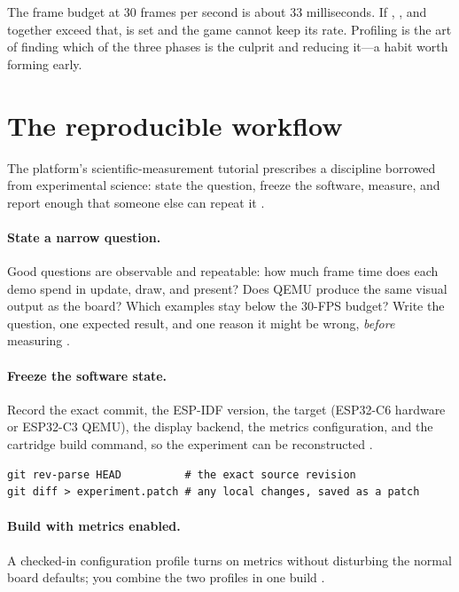 \begin{prgconcept}
The frame budget at 30 frames per second is about 33 milliseconds. If
, , and  together exceed that,
 is set and the game cannot keep its rate. Profiling is the
art of finding which of the three phases is the culprit and reducing it---a habit
worth forming early.
\end{prgconcept}

\section{The reproducible workflow}

The platform's scientific-measurement tutorial prescribes a discipline borrowed
from experimental science: state the question, freeze the software, measure, and
report enough that someone else can repeat it \citep{prg32scimeasure}.

\paragraph{State a narrow question.} Good questions are observable and repeatable:
how much frame time does each demo spend in update, draw, and present? Does QEMU
produce the same visual output as the board? Which examples stay below the 30-FPS
budget? Write the question, one expected result, and one reason it might be wrong,
\emph{before} measuring \citep{prg32scimeasure}.

\paragraph{Freeze the software state.} Record the exact commit, the ESP-IDF
version, the target (ESP32\nobreakdash-C6 hardware or ESP32\nobreakdash-C3 QEMU), the display backend,
the metrics configuration, and the cartridge build command, so the experiment can
be reconstructed \citep{prg32scimeasure}.

\begin{lstlisting}[style=bash,caption={Recording the software state for reproducibility.}]
git rev-parse HEAD          # the exact source revision
git diff > experiment.patch # any local changes, saved as a patch
\end{lstlisting}

\paragraph{Build with metrics enabled.} A checked-in configuration profile turns
on metrics without disturbing the normal board defaults; you combine the two
profiles in one build \citep{prg32metrics}.

